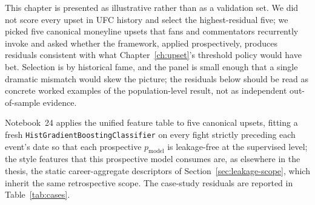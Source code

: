 \documentclass[12pt,oneside]{report}
\begin{document}
This chapter is presented as illustrative rather than as a
validation set.  We did not score every upset in UFC history and
select the highest-residual five; we picked five canonical
moneyline upsets that fans and commentators recurrently invoke and
asked whether the framework, applied prospectively, produces
residuals consistent with what Chapter~\ref{ch:upset}'s threshold
policy would have bet.  Selection is by historical fame, and the
panel is small enough that a single dramatic mismatch would skew
the picture; the residuals below should be read as concrete
worked examples of the population-level result, not as independent
out-of-sample evidence.

Notebook~24 applies the unified feature table to five canonical
upsets, fitting a fresh \texttt{HistGradientBoostingClassifier} on
every fight strictly preceding each event's date so that each
prospective \(p_{\mathrm{model}}\) is leakage-free at the supervised
level; the style features that this prospective model consumes are,
as elsewhere in the thesis, the static career-aggregate
descriptors of Section~\ref{sec:leakage-scope}, which inherit the
same retrospective scope.  The case-study residuals are reported in
Table~\ref{tab:cases}.
\end{document}
